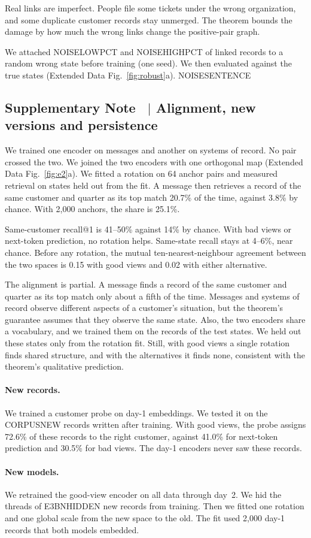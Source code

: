 \documentclass[11pt]{article}
\newcounter{suppnote}
\newcommand{\suppnote}[2]{\refstepcounter{suppnote}\label{#2}\subsection{Supplementary Note \thesuppnote\ $|$ #1}}
\begin{document}
Real links are imperfect. People file some tickets under the wrong organization, and some duplicate customer records stay unmerged. The theorem bounds the damage by how much the wrong links change the positive-pair graph.

We attached NOISELOWPCT and NOISEHIGHPCT of linked records to a random wrong state before training (one seed). We then evaluated against the true states (Extended Data Fig.~\ref{fig:robust}a). NOISESENTENCE

\suppnote{Alignment, new versions and persistence}{sec:e2}
\label{sec:e3}
We trained one encoder on messages and another on systems of record. No pair crossed the two. We joined the two encoders with one orthogonal map (Extended Data Fig.~\ref{fig:e2}a). We fitted a rotation on 64 anchor pairs and measured retrieval on states held out from the fit. A message then retrieves a record of the same customer and quarter as its top match 20.7\% of the time, against 3.8\% by chance. With 2{,}000 anchors, the share is 25.1\%.

Same-customer recall@1 is 41--50\% against 14\% by chance. With bad views or next-token prediction, no rotation helps. Same-state recall stays at 4--6\%, near chance. Before any rotation, the mutual ten-nearest-neighbour agreement between the two spaces is 0.15 with good views and 0.02 with either alternative.

The alignment is partial. A message finds a record of the same customer and quarter as its top match only about a fifth of the time. Messages and systems of record observe different aspects of a customer's situation, but the theorem's guarantee assumes that they observe the same state. Also, the two encoders share a vocabulary, and we trained them on the records of the test states. We held out these states only from the rotation fit. Still, with good views a single rotation finds shared structure, and with the alternatives it finds none, consistent with the theorem's qualitative prediction.

\paragraph{New records.} We trained a customer probe on day-1 embeddings. We tested it on the CORPUSNEW records written after training. With good views, the probe assigns 72.6\% of these records to the right customer, against 41.0\% for next-token prediction and 30.5\% for bad views. The day-1 encoders never saw these records.

\paragraph{New models.} We retrained the good-view encoder on all data through day~2. We hid the threads of E3BNHIDDEN new records from training. Then we fitted one rotation and one global scale from the new space to the old. The fit used 2{,}000 day-1 records that both models embedded.
\end{document}
